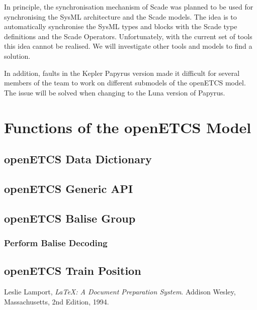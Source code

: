 \documentclass{template/openetcs_article}
\begin{document}
In principle, the synchronisation mechanism of Scade was planned to be used for synchronising the SysML architecture and the Scade models. The idea is to automatically synchronise the SysML types and blocks with the Scade type definitions and the Scade Operators. Unfortunately, with the current set of tools this idea cannot be realised. We will investigate other tools and models to find a solution. 

In addition, faults in the Kepler Papyrus version made it difficult for several members of the team to work on different submodels of the openETCS model. The issue will be solved when changing to the Luna version of Papyrus.



\section{Functions of the openETCS Model}

\subsection{openETCS Data Dictionary}



\subsection{openETCS Generic API}



\subsection{openETCS Balise Group}



\subsubsection{Perform Balise Decoding}
\subsection{openETCS Train Position}




\nocite{*}






\begin{thebibliography}{9}

  Leslie Lamport,
  \emph{\LaTeX: A Document Preparation System}.
  Addison Wesley, Massachusetts,
  2nd Edition,
  1994.

\end{thebibliography}

\end{document}
